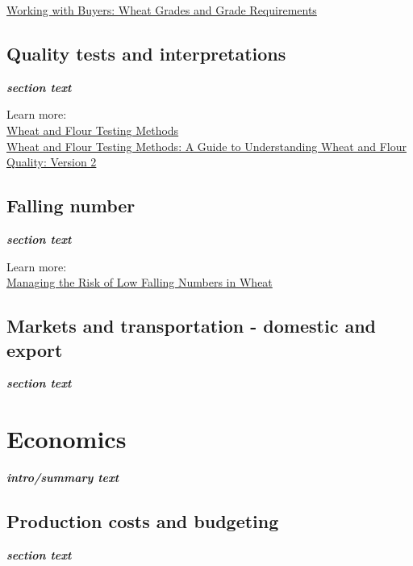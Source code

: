 \documentclass[
  letterpaper,
  DIV=11,
  numbers=noendperiod]{scrreprt}
\begin{document}
\href{https://www.uswheat.org/working-with-buyers/wheat-grade-factors/}{Working
with Buyers: Wheat Grades and Grade Requirements}

\section{Quality tests and
interpretations}\label{quality-tests-and-interpretations}

\textbf{\emph{section text}}

Learn more:\\
\href{https://www.uswheat.org/wp-content/uploads/2021/07/Wheat-and-Flour-Testing-Methods-Book.pdf}{Wheat
and Flour Testing Methods}\\
\href{https://www.grains.k-state.edu/igp/wheat-flour-testing/wheatflourbook/wheat-flour-book.pdf}{Wheat
and Flour Testing Methods: A Guide to Understanding Wheat and Flour
Quality: Version 2}

\section{Falling number}\label{falling-number}

\textbf{\emph{section text}}

Learn more:\\
\href{https://pubs.extension.wsu.edu/managing-the-risk-of-low-falling-numbers-in-wheat}{Managing
the Risk of Low Falling Numbers in Wheat}

\section{Markets and transportation - domestic and
export}\label{markets-and-transportation---domestic-and-export}

\textbf{\emph{section text}}


\chapter{Economics}\label{economics}

\textbf{\emph{intro/summary text}}

\section{Production costs and
budgeting}\label{production-costs-and-budgeting}

\textbf{\emph{section text}}
\end{document}
